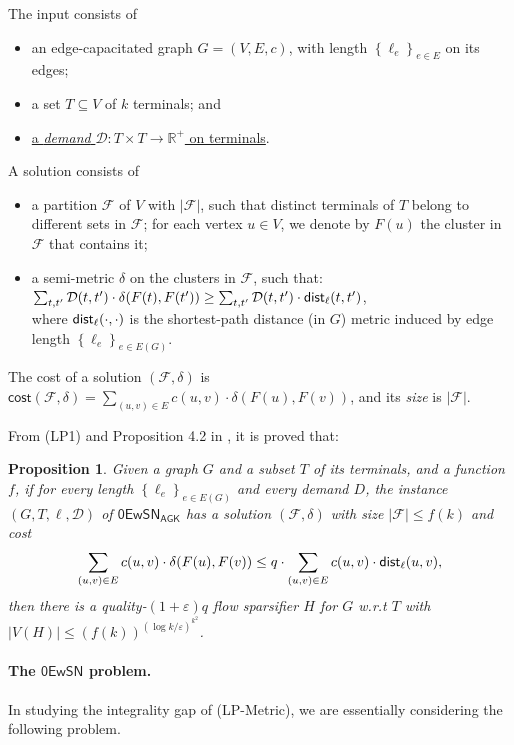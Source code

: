 \documentclass[11pt]{article}
\newtheorem{proposition}[theorem]{Proposition}
\theoremstyle{definition}
\newcommand{\set}[1]{\left\{ #1 \right\}}
\newcommand{\dset}{{\mathcal{D}}}
\newcommand{\fset}{{\mathcal{F}}}
\newcommand{\eps}{{\varepsilon}}
\newcommand{\dist}{\textnormal{\textsf{dist}}}
\newcommand\vol{\mathsf{cost}}
\newcounter{note}
\newcommand{\zesn}{\mathsf{0EwSN}}
\begin{document}
The input consists of
\begin{itemize}
\item an edge-capacitated graph $G=(V,E,c)$,  with length $\set{\ell_e}_{e\in E}$ on its edges;
\item a set $T\subseteq V$ of $k$ terminals; and
\item \underline{a \emph{demand} $\dset: T\times T\to \mathbb{R}^+$ on terminals}.
\end{itemize}
A solution consists of 
\begin{itemize}
	\item a partition $\fset$ of $V$ with $|\fset|$, such that distinct terminals of $T$ belong to different sets in $\fset$; for each vertex $u\in V$, we denote by $F(u)$ the cluster in $\fset$ that contains it;
	\item a semi-metric $\delta$ on the clusters in $\fset$, such that:\\ \underline{$\sum_{t,t'}\dset(t,t')\cdot\delta(F(t),F(t'))\ge \sum_{t,t'} \dset(t,t')\cdot\dist_{\ell}(t,t')$},\\
	where $\dist_{\ell}(\cdot,\cdot)$ is the shortest-path distance (in $G$) metric induced by edge length $\set{\ell_e}_{e\in E(G)}$.
\end{itemize}
The cost of a solution $(\fset,\delta)$ is $\vol(\fset,\delta)=\sum_{(u,v)\in E}c(u,v)\cdot\delta(F(u),F(v))$, and its \emph{size} is $|\fset|$.

From (LP1) and Proposition 4.2 in \cite{andoni2014towards}, it is proved that:
\begin{proposition}
Given a graph $G$ and a subset $T$ of its terminals, and a function $f$, if for every length $\set{\ell_e}_{e\in E(G)}$ and every demand $D$, the instance $(G,T,\ell,\dset)$ of $\zesn_{\textsf{AGK}}$ has a solution $(\fset,\delta)$ with size $|\fset|\le f(k)$ and cost 
\[\sum_{(u,v)\in E}c(u,v)\cdot\delta(F(u),F(v))\le q\cdot \sum_{(u,v)\in E}c(u,v)\cdot\dist_{\ell}(u,v),\] 
then there is a quality-$(1+\eps) q$ flow sparsifier $H$ for $G$ w.r.t $T$ with $|V(H)|\le (f(k))^{(\log k/\eps)^{k^2}}$.
\end{proposition}

\paragraph{The $\zesn$ problem.}
In studying the integrality gap of (\textnormal{\textsf{LP-Metric}}), we are essentially considering the following problem.
\end{document}
